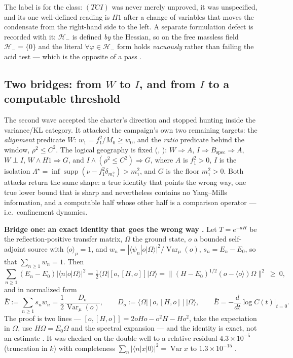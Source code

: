 The label is \LN{} for the class: $(TCI)$ was never merely unproved, it was unspecified, and its
one well-defined reading is $H1$ after a change of variables that moves the condensate from the
right-hand side to the left. A separate formulation defect is recorded with it: $\mathcal H_-$ is
defined \emph{by} the Hessian, so on the free massless field $\mathcal H_-=\{0\}$ and the literal
$\forall\varphi\in\mathcal H_-$ form holds \emph{vacuously} rather than failing the acid test ---
which is the opposite of a pass \LT.

\subsection{Two bridges: from $W$ to $I$, and from $I$ to a computable threshold}

The second wave accepted the charter's direction and stopped hunting inside the variance/KL category.
It attacked the campaign's own two remaining targets: the \emph{alignment} predicate
$W:\,w_1=f_1^2/M_0\ge w_0$, and the \emph{ratio} predicate behind the window,
$\rho^2\le C^2$. The logical geography is fixed (,
): $W\Rightarrow A$, $I\Rightarrow B_{\mathrm{spec}}\Rightarrow A$,
$W\perp I$, $W\wedge H1\Rightarrow G$, and $I\wedge(\rho^2\le C^2)\Rightarrow G$, where $A$ is
$f_1^2>0$, $I$ is the isolation $\Lambda^\star=\inf\operatorname{supp}(\nu-f_1^2\delta_{m_1^2})>m_1^2$,
and $G$ is the floor $m_1^2>0$. Both attacks return the same shape: a true identity that points the
wrong way, one true lower bound that is sharp and nevertheless contains no Yang--Mills information,
and a computable half whose other half is a comparison operator --- i.e.\ confinement dynamics.

\textbf{Bridge one: an exact identity that goes the wrong way \LT.} Let $T=e^{-aH}$ be the
reflection-positive transfer matrix, $\Omega$ the ground state, $o$ a bounded self-adjoint source
with $\langle o\rangle_\mu=1$, and $w_n=|\langle\psi_n|o|\Omega\rangle|^2/\operatorname{Var}_\mu(o)$,
$s_n=E_n-E_0$, so that $\sum_{n\ge1}w_n=1$. Then
\begin{equation}
  \sum_{n\ge1}(E_n-E_0)\bigl\lvert\langle n|o|\Omega\rangle\bigr\rvert^2
  =\tfrac12\langle\Omega|[o,[H,o]]|\Omega\rangle
  =\bigl\lVert (H-E_0)^{1/2}(o-\langle o\rangle)\Omega\bigr\rVert^2\ \ge\ 0 ,
  \label{eq:dcom}
\end{equation}
and in normalized form
\begin{equation}
  \bar E:=\sum_{n\ge1}s_nw_n=\frac{1}{2}\frac{D_o}{\operatorname{Var}_\mu(o)},
  \qquad D_o:=\langle\Omega|[o,[H,o]]|\Omega\rangle ,
  \qquad \bar E=-\frac{d}{dt}\log C(t)\Big|_{t=0}.
  \label{eq:barE}
\end{equation}
The proof is two lines --- $[o,[H,o]]=2oHo-o^2H-Ho^2$, take the expectation in $\Omega$, use
$H\Omega=E_0\Omega$ and the spectral expansion --- and the identity is exact, not an estimate \LT.
It was checked on the double well to a relative residual $4.3\times10^{-5}$ (truncation in $k$) with
completeness $\sum_n|\langle n|x|0\rangle|^2=\operatorname{Var}x$ to $1.3\times10^{-15}$ \LE.

